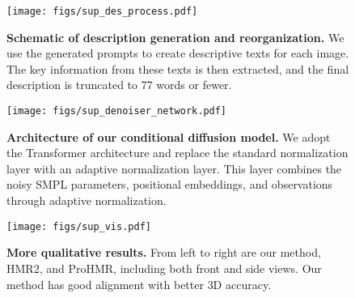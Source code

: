 \begin{figure}[h]
    \centering
    \texttt{[image: figs/sup\_des\_process.pdf]}
    \caption{\textbf{Schematic of description generation and reorganization.} We use the generated prompts to create descriptive texts for each image. The key information from these texts is then extracted, and the final description is truncated to 77 words or fewer.}
    \label{fig:sup_des_process}
\end{figure}

\begin{figure}[]
    \centering
    \texttt{[image: figs/sup\_denoiser\_network.pdf]}
    \caption{\textbf{Architecture of our conditional diffusion model.} We adopt the Transformer architecture and replace the standard normalization layer with an adaptive normalization layer. This layer combines the noisy SMPL parameters, positional embeddings, and observations through adaptive normalization.}
    \label{fig:sup_denoiser_network}
\end{figure}

\begin{figure}
    \centering
    \texttt{[image: figs/sup\_vis.pdf]}
    \caption{\textbf{More qualitative results.} From left to right are our method, HMR2, and ProHMR, including both front and side views. Our method has good alignment with better 3D accuracy.}
    \label{fig:enter-label}
\end{figure}
